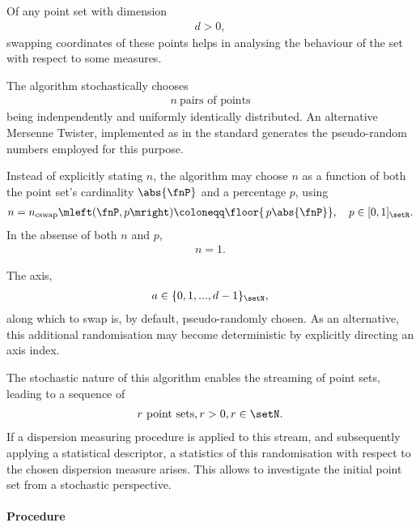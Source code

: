 
Of any point set with dimension
\begin{align*}
  d > 0,
\end{align*}
swapping coordinates of these points helps in analysing the behaviour of the set with respect to some measures. 

The algorithm stochastically chooses 
\begin{align*}
  n\ \text{pairs of points}
\end{align*}
being indenpendently and uniformly identically distributed. An alternative Mersenne Twister, implemented as  in the \symcpponeone{} standard generates the pseudo-random numbers employed for this purpose.

Instead of explicitly stating $n$, the algorithm may choose $n$ as a function of both the point set's cardinality $\abs{\fnP}$ and a percentage $p$, using
\begin{align}\label{eq:n-cswap}
  n = n_{\text{cswap}}\mleft(\fnP, p\mright) \coloneqq \floor{\,p\abs{\fnP}},\quad p \in [0,1]_{\setR}.
\end{align}
In the absense of both $n$ and $p$,
\begin{align*}
  n=1.
\end{align*}

The axis,
\begin{align*}
  a \in \{0,1,...,d-1\}_{\setN},
\end{align*}
along which to swap is, by default, pseudo-randomly chosen. As an alternative, this additional randomisation may become deterministic by explicitly directing an axis index.

The stochastic nature of this algorithm enables the streaming of point sets, leading to a sequence of
\begin{align*}
  r\ \text{point sets}, r > 0, r \in \setN.
\end{align*}
If a dispersion measuring procedure is applied to this stream, and subsequently applying a statistical descriptor, a statistics of this randomisation with respect to the chosen dispersion measure arises. This allows to investigate the initial point set from a stochastic perspective.

\paragraph{Procedure}

\begin{synopsis}
\end{synopsis}


